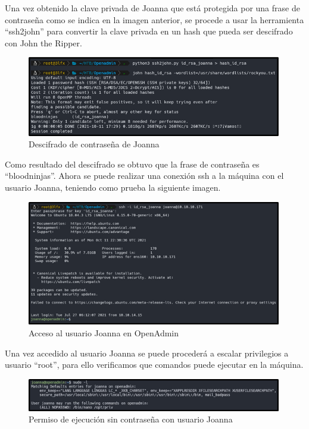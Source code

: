 Una vez obtenido la clave privada de Joanna que está protegida por una frase de contraseña como se indica en la imagen anterior, se procede a usar la herramienta “ssh2john” para convertir la clave privada en un hash que pueda ser descifrado con John the Ripper.
\begin{figure}[H]
    \centering
    \includegraphics[width=0.99\textwidth]{imagenes/desjoa.png}
    \caption{Descifrado de contraseña de Joanna}
\end{figure}
Como resultado del descifrado se obtuvo que la frase de contraseña es “bloodninjas”. Ahora se puede realizar una conexión ssh a la máquina con el usuario Joanna, teniendo como prueba la siguiente imagen.
\begin{figure}[H]
    \centering
    \includegraphics[width=0.99\textwidth]{imagenes/acjoa.png}
    \caption{Acceso al usuario Joanna en OpenAdmin}
\end{figure}
Una vez accedido al usuario Joanna se puede procederá a escalar privilegios a usuario “root”, para ello verificamos que comandos puede ejecutar en la máquina.
\begin{figure}[H]
    \centering
    \includegraphics[width=0.99\textwidth]{imagenes/perejop.png}
    \caption{Permiso de ejecución sin contraseña con usuario Joanna}
\end{figure}
